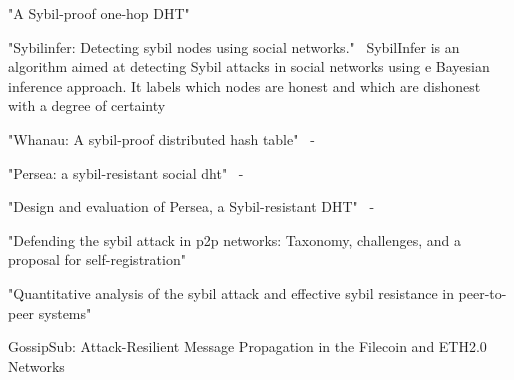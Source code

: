 


"A Sybil-proof one-hop DHT"~\cite{lesniewski2008sybil}

"Sybilinfer: Detecting sybil nodes using social networks."~\cite{danezis2009sybilinfer}
SybilInfer is an algorithm aimed at detecting Sybil attacks in social networks using e Bayesian inference approach.  It  labels which nodes are honest and which are
dishonest with a degree of certainty

"Whanau: A sybil-proof distributed hash table"~\cite{lesniewski2010whanau} - 


"Persea: a sybil-resistant social dht"~\cite{al2013persea} - 


"Design and evaluation of Persea, a Sybil-resistant DHT"~\cite{al2014design} - 

"Defending the sybil attack in p2p networks: Taxonomy, challenges, and a proposal for self-registration"~\cite{dinger2006defending}


"Quantitative analysis of the sybil attack and effective sybil resistance in peer-to-peer systems"~\cite{jetter2010quantitative}


GossipSub: Attack-Resilient Message Propagation in
the Filecoin and ETH2.0 Networks~\cite{gossipsub}
